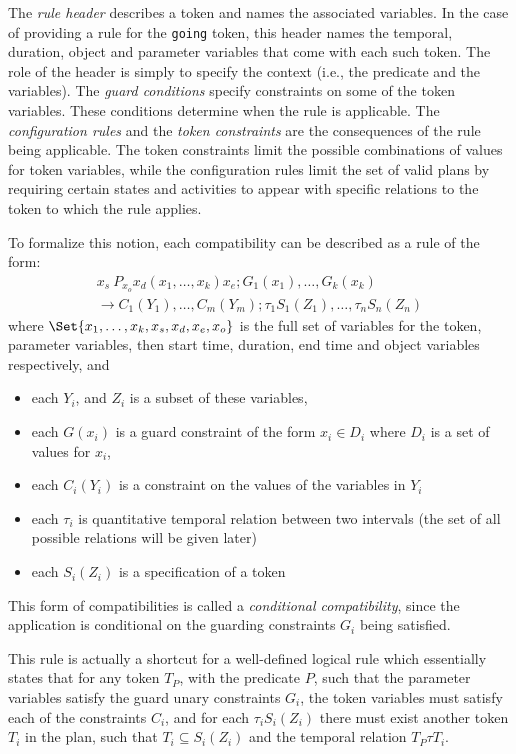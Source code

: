 The {\em rule header} describes a token and names the associated
variables.  In the case of providing a rule for the {\tt going} token,
this header names the temporal, duration, object and parameter
variables that come with each such token.  The role of the header is
simply to specify the context (i.e., the predicate and the variables).
The {\em guard conditions} specify constraints on some of the token
variables.  These conditions determine when the rule is applicable.  
The {\em configuration rules} and the {\em token constraints} are the 
consequences of the rule being applicable.  The token constraints 
limit the possible combinations of values for token variables, while 
the configuration rules limit the set of valid plans by requiring 
certain states and activities to appear with specific relations to the 
token to which the rule applies.

To formalize this notion, each compatibility can be described as a
rule of the form:
  \begin{eqnarray*} 
  x_s \ P_{x_o} x_d (x_1,\ldots,x_k) x_e; G_1(x_1), \ldots, G_k(x_k)
\\
  \rightarrow C_1(Y_1), \ldots, C_m(Y_m); \tau_1 S_1(Z_1), \ldots,
\tau_n S_n(Z_n)
  \end{eqnarray*}
  where $\Set{x_1,\ldots,x_k,x_s,x_d,x_e, x_o}$ is the full set of
variables for the token, parameter variables, then start time,
duration, end time and object variables respectively, and
  \begin{itemize}
  \item each $Y_i$, and $Z_i$ is a subset of these variables,
  \item each $G(x_i)$ is a guard constraint of the form $x_i \in D_i$
where $D_i$ is a set of values for $x_i$,
  \item each $C_i(Y_i)$ is a constraint on the values of the variables
in $Y_i$
  \item each $\tau_i$ is quantitative temporal relation between two
intervals (the set of all possible relations will be given later)
  \item each $S_i(Z_i)$ is a specification of a token
  \end{itemize}
  This form of compatibilities is called a {\em conditional
compatibility}, since the application is conditional on the guarding
constraints $G_i$ being satisfied.

This rule is actually a shortcut for a well-defined logical rule which
essentially states that for any token $T_P$, with the predicate $P$,
such that the parameter variables satisfy the guard unary constraints
$G_i$, the token variables must satisfy each of the constraints $C_i$,
and for each $\tau_i S_i(Z_i)$ there must exist another token $T_i$ in
the plan, such that $T_i \subseteq S_i(Z_i)$ and the temporal relation
$T_P \tau T_i$.

